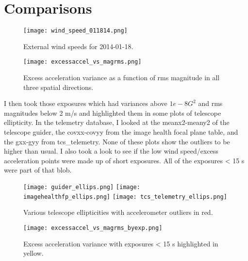 \documentclass{article}
\begin{document}
\section{Comparisons}

\begin{figure}[h!]
  \centering
  \texttt{[image: wind\_speed\_011814.png]}
  \caption{External wind speeds for 2014-01-18.}
\end{figure}

\begin{figure}[h!]
  \centering
  \texttt{[image: excessaccel\_vs\_magrms.png]}
  \caption{Excess acceleration variance as a function of rms magnitude in all three spatial directions.}
\end{figure}

I then took those exposures which had variances above $1e-8 G^{2}$ and rms magnitudes below 2 m/s and highlighted them in some plots of telescope ellipticity.
In the telemetry database, I looked at the meanx2-meany2 of the telescope guider, the covxx-covyy from the image health focal plane table, and the gxx-gyy from tcs\_telemetry.
None of these plots show the outliers to be higher than usual. 
I also took a look to see if the low wind speed/excess acceleration points were made up of short exposures. 
All of the exposures < 15 s were part of that blob. 

\begin{figure}[h!]
  \centering
  \texttt{[image: guider\_ellips.png]}
  \texttt{[image: imagehealthfp\_ellips.png]}
  \texttt{[image: tcs\_telemetry\_ellips.png]}
  \caption{Various telescope ellipticities with accelerometer outliers in red.}
\end{figure}

\begin{figure}[h!]
  \centering
  \texttt{[image: excessaccel\_vs\_magrms\_byexp.png]}
  \caption{Excess acceleration variance with exposures < 15 s highlighted in yellow.}
\end{figure}
\end{document}
